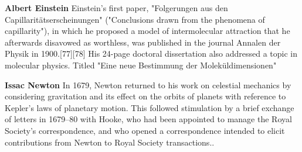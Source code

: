 \documentclass{SFEE_journal/SFEE}
\begin{document}
\begin{AuthorContribution}
    \textbf{Albert Einstein} Einstein's first paper, "Folgerungen aus den Capillaritätserscheinungen" ("Conclusions drawn from the phenomena of capillarity"), in which he proposed a model of intermolecular attraction that he afterwards disavowed as worthless, was published in the journal Annalen der Physik in 1900.[77][78] His 24-page doctoral dissertation also addressed a topic in molecular physics. Titled "Eine neue Bestimmung der Moleküldimensionen"\par
    \textbf{Issac Newton} In 1679, Newton returned to his work on celestial mechanics by considering gravitation and its effect on the orbits of planets with reference to Kepler's laws of planetary motion. This followed stimulation by a brief exchange of letters in 1679–80 with Hooke, who had been appointed to manage the Royal Society's correspondence, and who opened a correspondence intended to elicit contributions from Newton to Royal Society transactions..\par
\end{AuthorContribution}
\end{document}

